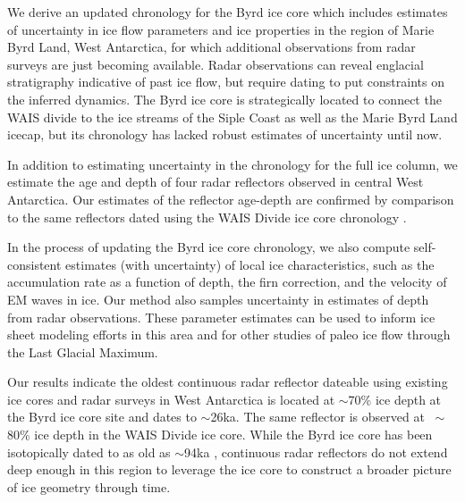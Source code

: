 

We derive an updated chronology for the Byrd ice core which includes estimates of uncertainty in ice flow parameters and ice properties in the region of Marie Byrd Land, West Antarctica, for which additional observations from radar surveys are just becoming available. Radar observations can reveal englacial stratigraphy indicative of past ice flow, but require dating to put constraints on the inferred dynamics. The Byrd ice core is strategically located to connect the WAIS divide to the ice streams of the Siple Coast as well as the Marie Byrd Land icecap, but its chronology has lacked robust estimates of uncertainty until now. 

In addition to estimating uncertainty in the chronology for the full ice column, we estimate the age and depth of four radar reflectors observed in central West Antarctica. Our estimates of the reflector age-depth are confirmed by comparison to the same reflectors dated using the WAIS Divide ice core chronology \citep{buizert2013}. 

In the process of updating the Byrd ice core chronology, we also compute self-consistent estimates (with uncertainty) of local ice characteristics, such as the accumulation rate as a function of depth, the firn correction, and the velocity of EM waves in ice. Our method also samples uncertainty in estimates of depth from radar observations. These parameter estimates can be used to inform ice sheet modeling efforts in this area and for other studies of paleo ice flow through the Last Glacial Maximum. 

Our results indicate the oldest continuous radar reflector dateable using existing ice cores and radar surveys in West Antarctica is located at $\sim$70\% ice depth at the Byrd ice core site and dates to $\sim$26ka. The same reflector is observed at $~\sim$80\% ice depth in the WAIS Divide ice core. While the Byrd ice core has been isotopically dated to as old as $\sim$94ka \citep{blunier?}, continuous radar reflectors do not extend deep enough in this region to leverage the ice core to construct a broader picture of ice geometry through time. 



